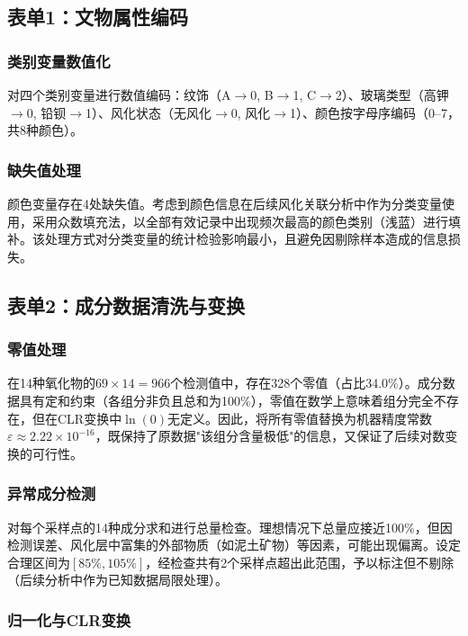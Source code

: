 \documentclass[12pt,a4paper]{ctexart}
\begin{document}
\subsection{表单1：文物属性编码}

\subsubsection{类别变量数值化}

对四个类别变量进行数值编码：纹饰（A$\rightarrow$0, B$\rightarrow$1, C$\rightarrow$2）、玻璃类型（高钾$\rightarrow$0, 铅钡$\rightarrow$1）、风化状态（无风化$\rightarrow$0, 风化$\rightarrow$1）、颜色按字母序编码（0--7，共8种颜色）。

\subsubsection{缺失值处理}

颜色变量存在4处缺失值。考虑到颜色信息在后续风化关联分析中作为分类变量使用，采用众数填充法，以全部有效记录中出现频次最高的颜色类别（浅蓝）进行填补。该处理方式对分类变量的统计检验影响最小，且避免因剔除样本造成的信息损失。

\subsection{表单2：成分数据清洗与变换}

\subsubsection{零值处理}

在14种氧化物的$69\times14=966$个检测值中，存在328个零值（占比34.0\%）。成分数据具有定和约束（各组分非负且总和为100\%），零值在数学上意味着组分完全不存在，但在CLR变换中$\ln(0)$无定义。因此，将所有零值替换为机器精度常数$\varepsilon\approx2.22\times10^{-16}$，既保持了原数据"该组分含量极低"的信息，又保证了后续对数变换的可行性。

\subsubsection{异常成分检测}

对每个采样点的14种成分求和进行总量检查。理想情况下总量应接近100\%，但因检测误差、风化层中富集的外部物质（如泥土矿物）等因素，可能出现偏离。设定合理区间为$[85\%,105\%]$，经检查共有2个采样点超出此范围，予以标注但不剔除（后续分析中作为已知数据局限处理）。

\subsubsection{归一化与CLR变换}
\end{document}
